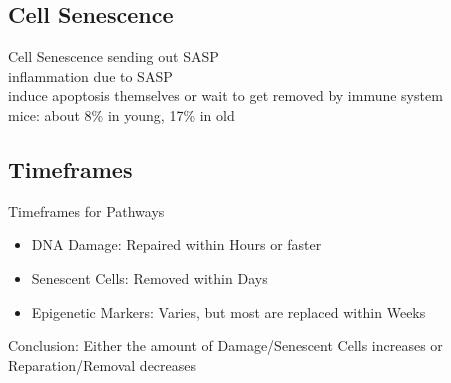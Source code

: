 \subsection{Cell Senescence}

\begin{frame}[c]{Cell Senescence}
    sending out SASP \\
    inflammation due to SASP \\
    induce apoptosis themselves or wait to get removed by immune system \\
    mice: about 8\% in young, 17\% in old \cite{folgueras2018mouse} \\
\end{frame}


\subsection{Timeframes}

\begin{frame}[c]{Timeframes for Pathways}
    \large
    \begin{itemize}[<+(1)->]
        \item DNA Damage: Repaired within Hours or faster \cite{frankenberg1989review}
        \item Senescent Cells: Removed within Days \cite{karin2018senescent}
        \item Epigenetic Markers: Varies, but most are replaced within Weeks \cite{ginno2020genome} \cite{yamagata2012rapid}
    \end{itemize}
    \pause
    Conclusion: Either the amount of Damage/Senescent Cells increases or Reparation/Removal decreases
\end{frame}


\backupend
